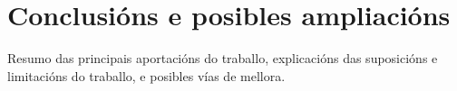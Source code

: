 \chapter{Conclusións e posibles ampliacións}

Resumo das principais aportacións do traballo, explicacións das suposicións e limitacións do traballo, e posibles vías de mellora.
